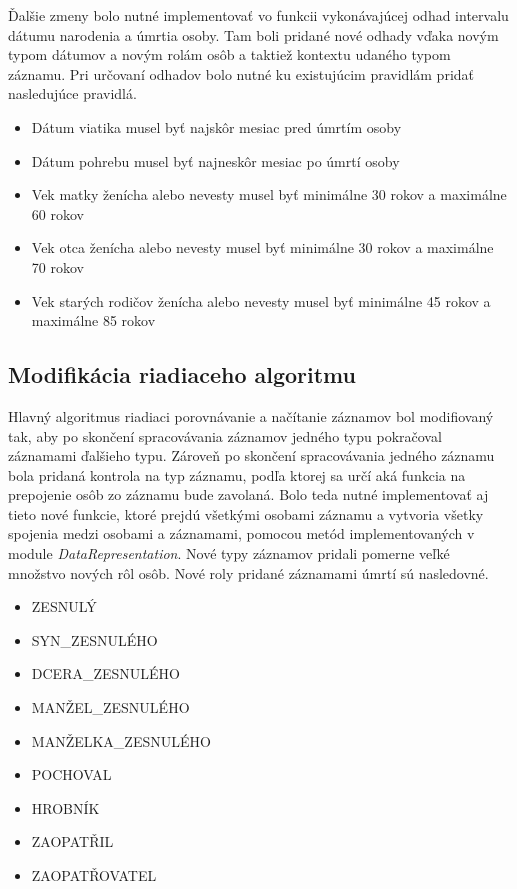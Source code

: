 Ďalšie zmeny bolo nutné implementovať vo funkcii vykonávajúcej odhad intervalu dátumu narodenia a úmrtia osoby. Tam boli pridané nové odhady vďaka novým typom dátumov a novým rolám osôb a taktiež kontextu udaného typom záznamu. Pri určovaní odhadov bolo nutné ku existujúcim pravidlám pridať nasledujúce pravidlá.

\begin{itemize}
    \item Dátum viatika musel byť najskôr mesiac pred úmrtím osoby
    \item Dátum pohrebu musel byť najneskôr mesiac po úmrtí osoby
    \item Vek matky ženícha alebo nevesty musel byť minimálne 30 rokov a maximálne 60 rokov
    \item Vek otca ženícha alebo nevesty musel byť minimálne 30 rokov a maximálne 70 rokov
    \item Vek starých rodičov ženícha alebo nevesty musel byť minimálne 45 rokov a maximálne 85 rokov
\end{itemize}


\subsection{Modifikácia riadiaceho algoritmu}

Hlavný algoritmus riadiaci porovnávanie a načítanie záznamov bol modifiovaný tak, aby po skončení spracovávania záznamov jedného typu pokračoval záznamami ďalšieho typu. Zároveň po skončení spracovávania jedného záznamu bola pridaná kontrola na typ záznamu, podľa ktorej sa určí aká funkcia na prepojenie osôb zo záznamu bude zavolaná. Bolo teda nutné implementovať aj tieto nové funkcie, ktoré prejdú všetkými osobami záznamu a vytvoria všetky spojenia medzi osobami a záznamami, pomocou metód implementovaných v module \textit{DataRepresentation}. Nové typy záznamov pridali pomerne veľké množstvo nových rôl osôb. Nové roly pridané záznamami úmrtí sú nasledovné.
\pagebreak
\begin{multicols}{2}
\begin{itemize}
    \item ZESNULÝ
    \item SYN\_ZESNULÉHO
    \item DCERA\_ZESNULÉHO
    \item MANŽEL\_ZESNULÉHO
    \item MANŽELKA\_ZESNULÉHO
    \item POCHOVAL
    \item HROBNÍK
    \item ZAOPATŘIL
    \item ZAOPATŘOVATEL
\end{itemize}
\end{multicols}

